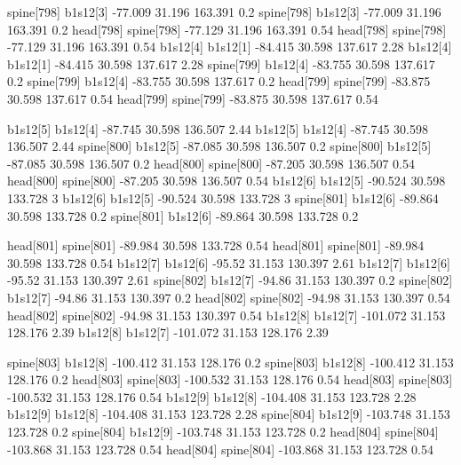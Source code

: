 spine[798]    b1s12[3]    -77.009    31.196    163.391    0.2
spine[798]    b1s12[3]    -77.009    31.196    163.391    0.2
head[798]    spine[798]    -77.129    31.196    163.391    0.54
head[798]    spine[798]    -77.129    31.196    163.391    0.54
b1s12[4]    b1s12[1]    -84.415    30.598    137.617    2.28
b1s12[4]    b1s12[1]    -84.415    30.598    137.617    2.28
spine[799]    b1s12[4]    -83.755    30.598    137.617    0.2
spine[799]    b1s12[4]    -83.755    30.598    137.617    0.2
head[799]    spine[799]    -83.875    30.598    137.617    0.54
head[799]    spine[799]    -83.875    30.598    137.617    0.54


b1s12[5]    b1s12[4]    -87.745    30.598    136.507    2.44
b1s12[5]    b1s12[4]    -87.745    30.598    136.507    2.44
spine[800]    b1s12[5]    -87.085    30.598    136.507    0.2
spine[800]    b1s12[5]    -87.085    30.598    136.507    0.2
head[800]    spine[800]    -87.205    30.598    136.507    0.54
head[800]    spine[800]    -87.205    30.598    136.507    0.54
b1s12[6]    b1s12[5]    -90.524    30.598    133.728    3
b1s12[6]    b1s12[5]    -90.524    30.598    133.728    3
spine[801]    b1s12[6]    -89.864    30.598    133.728    0.2
spine[801]    b1s12[6]    -89.864    30.598    133.728    0.2


head[801]    spine[801]    -89.984    30.598    133.728    0.54
head[801]    spine[801]    -89.984    30.598    133.728    0.54
b1s12[7]    b1s12[6]    -95.52    31.153    130.397    2.61
b1s12[7]    b1s12[6]    -95.52    31.153    130.397    2.61
spine[802]    b1s12[7]    -94.86    31.153    130.397    0.2
spine[802]    b1s12[7]    -94.86    31.153    130.397    0.2
head[802]    spine[802]    -94.98    31.153    130.397    0.54
head[802]    spine[802]    -94.98    31.153    130.397    0.54
b1s12[8]    b1s12[7]    -101.072    31.153    128.176    2.39
b1s12[8]    b1s12[7]    -101.072    31.153    128.176    2.39


spine[803]    b1s12[8]    -100.412    31.153    128.176    0.2
spine[803]    b1s12[8]    -100.412    31.153    128.176    0.2
head[803]    spine[803]    -100.532    31.153    128.176    0.54
head[803]    spine[803]    -100.532    31.153    128.176    0.54
b1s12[9]    b1s12[8]    -104.408    31.153    123.728    2.28
b1s12[9]    b1s12[8]    -104.408    31.153    123.728    2.28
spine[804]    b1s12[9]    -103.748    31.153    123.728    0.2
spine[804]    b1s12[9]    -103.748    31.153    123.728    0.2
head[804]    spine[804]    -103.868    31.153    123.728    0.54
head[804]    spine[804]    -103.868    31.153    123.728    0.54


